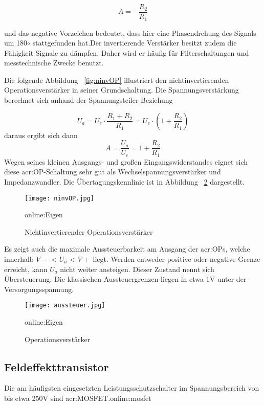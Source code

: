 \begin{equation}
	\label{equ:bsp1}
	A = - \frac{R_{2}}{R_{1}}
\end{equation}

und das negative Vorzeichen bedeutet, dass hier eine Phasendrehung des Signals um 180$\circ$ stattgefunden hat.Der invertierende Verstärker besitzt zudem die Fähigkeit Signale zu dämpfen. Daher wird er häufig für Filterschaltungen und messtechnische Zwecke benutzt. 

Die folgende Abbildung ~\ref{fig:ninvOP} illustriert den nichtinvertierenden Operationsverstärker in seiner Grundschaltung. Die Spannungsverstärkung berechnet sich anhand der Spannungsteiler Beziehung

\begin{equation}
	\label{equ:bsp1}
	U_{a} = U_{e} \cdot \frac{R_{1} + R_{2}}{R_{1}} = U_{e} \cdot (1+ \frac{R_{2}}{R_{1}})
\end{equation}
daraus ergibt sich dann
\begin{equation}
	\label{equ:bsp1}
	A = \frac{U_{a}}{U_{e}} = 1+ \frac{R_{2}}{R_{1}}
\end{equation}
Wegen seines kleinen Ausgangs- und großen Eingangswiderstandes eignet sich diese \gls{acr:OP}-Schaltung sehr gut als  Wechselspannungsverstärker und Impedanzwandler. Die Übertagungskennlinie ist in Abbildung ~\ref{fig:aussteuer} dargestellt. 

\begin{figure}[H]
	\centering
	\texttt{[image: ninvOP.jpg]}
	\caption[Nichtinvertierender Operationsverstärker]{Nichtinvertierender Operationsverstärker} 
	\gls{online:Eigen}
	\label{fig:invOP}
\end{figure}

Es zeigt auch die maximale Aussteuerbarkeit am Ausgang der \gls{acr:OP}s, welche innerhalb $V-$ < $U_{a}$ < $V+$ liegt. Werden entweder positive oder negative Grenze erreicht, kann $U_{a}$ nicht weiter ansteigen. Dieser Zustand nennt sich Übersteuerung. Die klassischen Aussteuergrenzen liegen in etwa 1V unter der Versorgungsspannung.\cite{federauOperationsverstaerker2017}

\begin{figure}[H]
	\centering
	\texttt{[image: aussteuer.jpg]}
	\caption[Operationsverstärker]{Operationsverstärker} 
	\gls{online:Eigen}
	\label{fig:aussteuer}
\end{figure} 

\newpage
\subsection{Feldeffekttransistor}
\label{subsec:Unterabschnitt12}
Die am häufigsten eingesetzten Leistungsschutzschalter im Spannungsbereich von bis etwa 250V sind \gls{acr:MOSFET}.\gls{online:mosfet}


